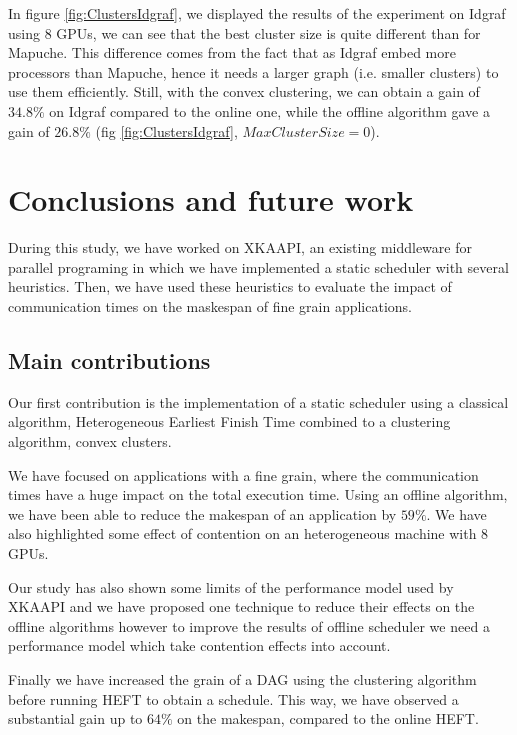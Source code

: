 \documentclass[10pt, conference, compsocconf,pdftex,dvipsnames]{IEEEtran}
\begin{document}
In figure \ref{fig:ClustersIdgraf}, we displayed the results of the
experiment on Idgraf using $8$ GPUs, we can see that the best cluster size is
quite different than for Mapuche. This difference comes from the fact that as
Idgraf embed more processors than Mapuche, hence it needs a larger graph (i.e.
smaller clusters) to use them efficiently. Still, with the convex clustering,
we can obtain a gain of $34.8\%$ on Idgraf compared to the online one, while
the offline algorithm gave a gain of $26.8\%$ (fig
\ref{fig:ClustersIdgraf}, $MaxClusterSize=0$).



\section{Conclusions and future work}
\label{sec:cncl}
During this study, we have worked on
XKAAPI\cite{gautier2007kaapi,gautierxkaapi}, an existing middleware for
parallel programing in which we have implemented a static scheduler with
several heuristics. Then, we have used these heuristics to evaluate the impact
of communication times on the maskespan of fine grain applications.

\subsection{Main contributions}
\label{chap:cncl-contrib}

Our first contribution is the implementation of a static scheduler using
a classical algorithm, Heterogeneous Earliest Finish Time combined to a
clustering algorithm, convex clusters.

We have focused on applications with a fine grain, where the communication
times have a huge impact on the total execution time. Using an offline
algorithm, we have been able to reduce the makespan of an application by
$59\%$. We have also highlighted some effect of contention on an heterogeneous
machine with 8 GPUs. 

Our study has also shown some limits of the performance model used by XKAAPI
and we have proposed one technique to reduce their effects on the offline
algorithms however to improve the results of offline scheduler we need a
performance model which take contention effects into account.

Finally we have increased the grain of a DAG using the clustering algorithm
before running HEFT to obtain a schedule. This way, we have observed a
substantial gain up to $64\%$ on the makespan, compared to the online HEFT.
\end{document}
